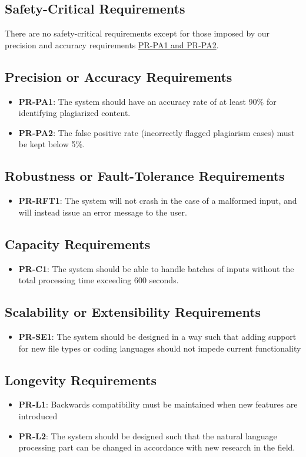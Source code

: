 \documentclass[12pt]{article}
\begin{document}
\subsection{Safety-Critical Requirements}
There are no safety-critical requirements except for those imposed by our precision and accuracy requirements \hyperlink{subsection.12.3}{PR-PA1 and PR-PA2}.
\subsection{Precision or Accuracy Requirements}
\begin{itemize}
    \item \textbf{PR-PA1}: The system should have an accuracy rate of at least 90\% for identifying plagiarized content.
    \item \textbf{PR-PA2}: The false positive rate (incorrectly flagged plagiarism cases) must be kept below 5\%.
\end{itemize}
\subsection{Robustness or Fault-Tolerance Requirements}
\begin{itemize}
    \item \textbf{PR-RFT1}: The system will not crash in the case of a malformed input, and will instead issue an error message to the user.
\end{itemize}
\subsection{Capacity Requirements}
\begin{itemize}
    \item \textbf{PR-C1}: The system should be able to handle batches of inputs without the total processing time exceeding 600 seconds.
\end{itemize}
\subsection{Scalability or Extensibility Requirements}
\begin{itemize}
    \item \textbf{PR-SE1}: The system should be designed in a way such that adding support for new file types or coding languages should not impede current functionality
\end{itemize}
\subsection{Longevity Requirements}
\begin{itemize}
    \item \textbf{PR-L1}: Backwards compatibility must be maintained when new features are introduced
    \item \textbf{PR-L2}: The system should be designed such that the natural language processing part can be changed in accordance with new research in the field.
\end{itemize}
\end{document}
